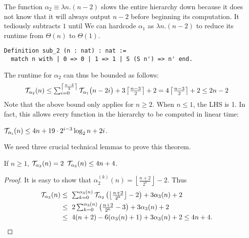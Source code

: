 The function $\alpha_2 \equiv \lambda n.(n-2)$
slows the entire hierarchy down because
it does not know that it will always output $n-2$ before beginning its 
computation.
It tediously subtracts $1$ until 
We can hardcode $\alpha_1$ as $\lambda n.(n-2)$ to reduce its runtime
from $\Theta(n)$ to $\Theta(1)$.
\begin{lstlisting}
Definition sub_2 (n : nat) : nat :=
  match n with | 0 => 0 | 1 => 1 | S (S n') => n' end.
\end{lstlisting}
The runtime for $\alpha_2$ can thus be bounded as follows:
\begin{equation*}
\mathcal{T}_{\alpha_2}(n)
 \le \textstyle \sum_{i=0}^{\left\lceil \frac{n-3}{2} \right\rceil} \mathcal{T}_{\alpha_1}\big(n-2i\big) + 3\left\lceil \frac{n-3}{2} \right\rceil + 2  =  4\left\lceil \frac{n-3}{2} \right\rceil + 2
 \le 2n - 2
\end{equation*}
Note that the above bound only applies for $n\ge 2$. When $n\le 1$, the LHS is 1. In fact, this allows every function in the hierarchy to be computed in linear time:
\begin{thm} \label{thm: inv-ack-hier-runtime-improved}
	$\mathcal{T}_{\alpha_i}(n) \le 4n + 19\cdot 2^{i-3}\log_2n + 2i$.
\end{thm}
We need three crucial technical lemmas to prove this theorem.
\begin{lem} \label{lem: inv-ack-3-runtime}
	If $n\ge 1$, $\mathcal{T}_{\alpha_3}(n) = 2$ $\mathcal{T}_{\alpha_3}(n) \le 4n + 4$.
\end{lem}
\begin{proof}
	It is easy to show that $\alpha_2^{(k)}(n) = \left\lfloor \frac{n+2}{2^k} \right\rfloor - 2$. Thus
	\begin{equation*}
	\begin{aligned}
		\runtime_{\alpha_3}(n)
		& \textstyle \le \ \sum_{k=0}^{\alpha_{3}(n)}\runtime_{\alpha_2}\left(\left\lfloor \frac{n+2}{2^k} \right\rfloor - 2\right) + 3\alpha_{3}(n) + 2 \\
		& \textstyle \le \ 2\sum_{k=0}^{\alpha_3(n)}\left(\frac{n+2}{2^k} - 3\right) + 3\alpha_3(n) + 2 \\
		& \le \ 4(n + 2) - 6(\alpha_3(n) + 1) + 3\alpha_3(n) + 2 \le 4n + 4.
	\end{aligned}
\end{equation*}
\end{proof}
